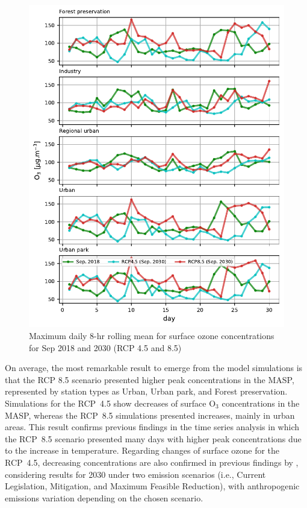 \begin{figure}[!hbt]
\begin{center}
	\includegraphics{fig/MDA8_type_rcps}
\end{center}
  \caption{Maximum daily 8-hr rolling mean for surface ozone concentrations for Sep 2018 and 2030 (RCP 4.5 and 8.5)}
  \label{fig:MDA8_rcps}
\end{figure}

On average, the most remarkable result to emerge from the model simulations is that the RCP 8.5 scenario presented higher peak concentrations in the MASP, represented by station types as Urban, Urban park, and Forest preservation.
Simulations for the RCP~4.5 show decreases of surface O$_3$ concentrations in the MASP, whereas the RCP~8.5 simulations presented increases, mainly in urban areas.
This result confirms previous findings in the time series analysis in which the RCP~8.5 scenario presented many days with higher peak concentrations due to the increase in temperature.
Regarding changes of surface ozone for the RCP~4.5, decreasing concentrations are also confirmed in previous findings by \citet{Schuch2020}, considering results for 2030 under two emission scenarios (i.e., Current Legislation, Mitigation, and Maximum Feasible Reduction), with anthropogenic emissions variation depending on the chosen scenario.

